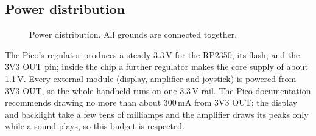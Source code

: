 \documentclass[11pt,a4paper]{article}
\begin{document}
\subsection{Power distribution}\label{sec:powerhw}
\begin{figure}[H]
\centering
{}
\caption{Power distribution. All grounds are connected together.}
\end{figure}

\noindent The Pico's regulator produces a steady 3.3\,V for the RP2350, its
flash, and the 3V3 OUT pin; inside the chip a further regulator makes the core
supply of about 1.1\,V. Every external module (display, amplifier and joystick)
is powered from 3V3 OUT, so the whole handheld runs on one 3.3\,V rail. The Pico
documentation recommends drawing no more than about 300\,mA from 3V3 OUT; the
display and backlight take a few tens of milliamps and the amplifier draws its
peaks only while a sound plays, so this budget is respected.

\end{document}
